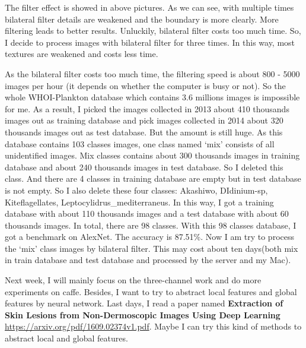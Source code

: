 \documentclass{article}
\begin{document}
The filter effect is showed in above pictures. As we can see, with multiple times bilateral filter  details are weakened and the boundary is more clearly. More filtering leads to better results. Unluckily, bilateral filter costs too much time. So, I decide to process images with bilateral filter for three times.  In this way, most textures are weakened and costs less time. 

As the bilateral filter costs too much time, the filtering speed is about 800 - 5000 images per hour (it depends on whether the computer is busy or not). So the whole WHOI-Plankton database which contains 3.6 millions images is impossible for me. As a result, I picked the images collected in 2013 about 410 thousands images out as training database and pick images collected in 2014 about 320 thousands images out as test database. But the amount is still huge. As this database contains 103 classes images, one class named `mix' consists of all unidentified images. Mix classes contains about 300 thousands images in training database and about 240 thousands images in test database. So I deleted this class. And there are 4 classes in training database are empty but in test database is not empty. So I also delete these four classes: Akashiwo, DIdinium-sp, Kiteflagellates, Leptocylidrus\_mediterraneus. In this way, I got a training database with about 110 thousands images and a test database with about 60 thousands images. In total, there are 98 classes. With this 98 classes database, I got a benchmark on AlexNet. The accuracy is 87.51\%. Now I am try to process the `mix' class images by bilateral filter. This may cost about ten days(both mix in train database and test database and processed by the server and my Mac). 

Next week, I will mainly focus on the three-channel work and do more experiments on caffe. Besides, I want to try to abstract local features and global features by neural network. Last days, I read a paper named \textbf{Extraction of Skin Lesions from Non-Dermoscopic Images Using Deep Learning} \url{https://arxiv.org/pdf/1609.02374v1.pdf}. Maybe I can try this kind of methods to abstract local and global features.
\end{document}
